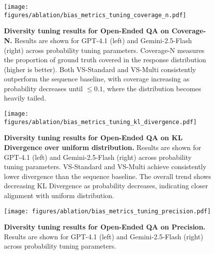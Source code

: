 
\begin{figure}[h]
    \centering
    \texttt{[image: figures/ablation/bias\_metrics\_tuning\_coverage\_n.pdf]}
    \caption{\textbf{Diversity tuning results for Open-Ended QA on Coverage-N.} Results are shown for GPT-4.1 (left) and Gemini-2.5-Flash (right) across probability tuning parameters. Coverage-N measures the proportion of ground truth covered in the response distribution (higher is better). Both VS-Standard and VS-Multi consistently outperform the sequence baseline, with coverage increasing as probability decreases until $\leq 0.1$, where the distribution becomes heavily tailed.
    }
    \label{fig:diversity_tuning_coverage_n}
\end{figure}

\begin{figure}[h]
    \centering
    \texttt{[image: figures/ablation/bias\_metrics\_tuning\_kl\_divergence.pdf]}
    \caption{\textbf{Diversity tuning results for Open-Ended QA on KL Divergence over uniform distribution.} Results are shown for GPT-4.1 (left) and Gemini-2.5-Flash (right) across probability tuning parameters. VS-Standard and VS-Multi achieve consistently lower divergence than the sequence baseline. The overall trend shows decreasing KL Divergence as probability decreases, indicating closer alignment with uniform distribution.
    }
    \label{fig:diversity_tuning_kl_divergence}
\end{figure}

\begin{figure}[h]
    \centering
    \texttt{[image: figures/ablation/bias\_metrics\_tuning\_precision.pdf]}
    \caption{\textbf{Diversity tuning results for Open-Ended QA on Precision.} Results are shown for GPT-4.1 (left) and Gemini-2.5-Flash (right) across probability tuning parameters.
    }
    \label{fig:diversity_tuning_precision}
\end{figure}